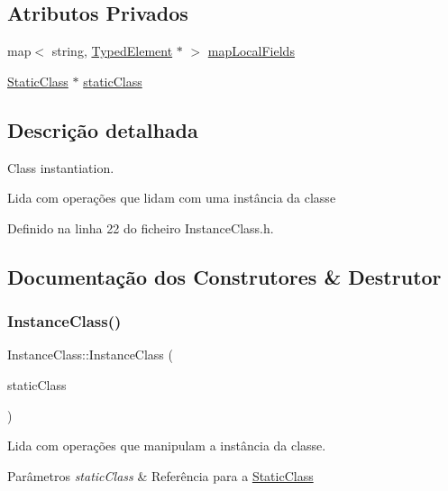 \subsection*{Atributos Privados}
\begin{DoxyCompactItemize}
\item 
map$<$ string, \hyperlink{BasicTypes_8h_a97b332303b1262282599e6ede0637b82}{Typed\+Element} $\ast$ $>$ \hyperlink{classInstanceClass_a455e05eefc1273e6cf22607c8941e9c0}{map\+Local\+Fields}
\item 
\hyperlink{classStaticClass}{Static\+Class} $\ast$ \hyperlink{classInstanceClass_a45804f1afe3666a4b4511cf8e3f1013b}{static\+Class}
\end{DoxyCompactItemize}


\subsection{Descrição detalhada}
Class instantiation. 

Lida com operações que lidam com uma instância da classe 

Definido na linha 22 do ficheiro Instance\+Class.\+h.



\subsection{Documentação dos Construtores \& Destrutor}
\mbox{\label{classInstanceClass_ac1bee1eb9725e1fec8de7f4cf97f369c}} 
\subsubsection{\texorpdfstring{Instance\+Class()}{InstanceClass()}}
{\footnotesize\ttfamily Instance\+Class\+::\+Instance\+Class (\begin{DoxyParamCaption}\item[{\hyperlink{classStaticClass}{Static\+Class} $\ast$}]{static\+Class }\end{DoxyParamCaption})}



Lida com operações que manipulam a instância da classe. 


\begin{DoxyParams}{Parâmetros}
{\em static\+Class} & Referência para a \hyperlink{classStaticClass}{Static\+Class} \\
\hline
\end{DoxyParams}



